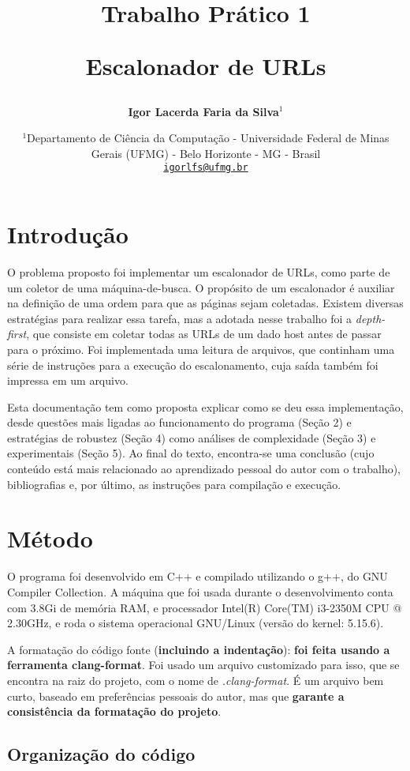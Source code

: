 \documentclass{article}
\author{\textbf{Igor Lacerda Faria da Silva\( ^1 \)} }
\title{\textbf{Trabalho Prático 1}

\textbf{Escalonador de URLs}}
\date{%
    \( ^1 \)Departamento de Ciência da Computação - Universidade Federal de Minas Gerais (UFMG) - Belo Horizonte - MG - Brasil \\ [2ex]
    \href{mailto:igorlfs@ufmg.br}{\nolinkurl{igorlfs@ufmg.br}}
}
\begin{document}
\maketitle

\section{Introdução}

O problema proposto foi implementar um escalonador de URLs, como parte de um coletor de uma máquina-de-busca. O propósito de um escalonador é auxiliar na definição de uma ordem para que as páginas sejam coletadas. Existem diversas estratégias para realizar essa tarefa, mas a adotada nesse trabalho foi a \textit{depth-first}, que consiste em coletar todas as URLs de um dado host antes de passar para o próximo. Foi implementada uma leitura de arquivos, que continham uma série de instruções para a execução do escalonamento, cuja saída também foi impressa em um arquivo.

Esta documentação tem como proposta explicar como se deu essa implementação, desde questões mais ligadas ao funcionamento do programa (Seção 2) e estratégias de robustez (Seção 4) como análises de complexidade (Seção 3) e experimentais (Seção 5). Ao final do texto, encontra-se uma conclusão (cujo conteúdo está mais relacionado ao aprendizado pessoal do autor com o trabalho), bibliografias e, por último, as instruções para compilação e execução.

\section{Método}

O programa foi desenvolvido em C++ e compilado utilizando o g++, do GNU Compiler Collection. A máquina que foi usada durante o desenvolvimento conta com 3.8Gi de memória RAM, e processador Intel(R) Core(TM) i3-2350M CPU @ 2.30GHz, e roda o sistema operacional GNU/Linux (versão do kernel: 5.15.6).

A formatação do código fonte (\textbf{incluindo a indentação}): \textbf{foi feita usando a ferramenta clang-format}. Foi usado um arquivo customizado para isso, que se encontra na raiz do projeto, com o nome de \textit{.clang-format}. É um arquivo bem curto, baseado em preferências pessoais do autor, mas que \textbf{garante a consistência da formatação do projeto}.

\subsection{Organização do código}
\end{document}
